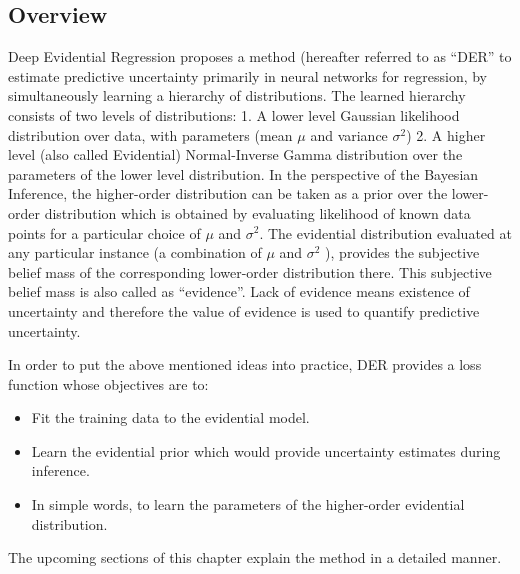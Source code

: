 	\subsection{Overview}\label{sec_overview_der}  
	Deep Evidential Regression proposes a method (hereafter referred to as \enquote{DER} to estimate predictive uncertainty primarily in neural networks for regression, by simultaneously learning a hierarchy of distributions. The learned hierarchy consists of two levels of distributions: 1. A lower level Gaussian likelihood distribution over data, with parameters (mean $\mu$ and variance $\sigma^2$) 2. A higher level (also called Evidential) Normal-Inverse Gamma distribution over the parameters of the lower level distribution. In the perspective of the Bayesian Inference, the higher-order distribution can be taken as a prior over the lower-order distribution which is obtained by evaluating likelihood of known data points for a particular choice of $\mu$ and $\sigma^2$. The evidential distribution evaluated at any particular instance (a combination of $\mu$ and $\sigma^2$  ), provides the subjective belief mass of the corresponding lower-order distribution there. This subjective belief mass is also called as \enquote{evidence}. Lack of evidence means existence of uncertainty and therefore the value of evidence is used to quantify predictive uncertainty. 
	
	In order to put the above mentioned ideas into practice, DER provides a loss function whose objectives are to:
	\begin{itemize}
		\item Fit the training data to the evidential model.
		\item Learn the evidential prior which would provide uncertainty estimates during inference.
		\item In simple words, to learn the parameters of the higher-order evidential distribution.    
	\end{itemize} 
	The upcoming sections of this chapter explain the method in a detailed manner.
	

